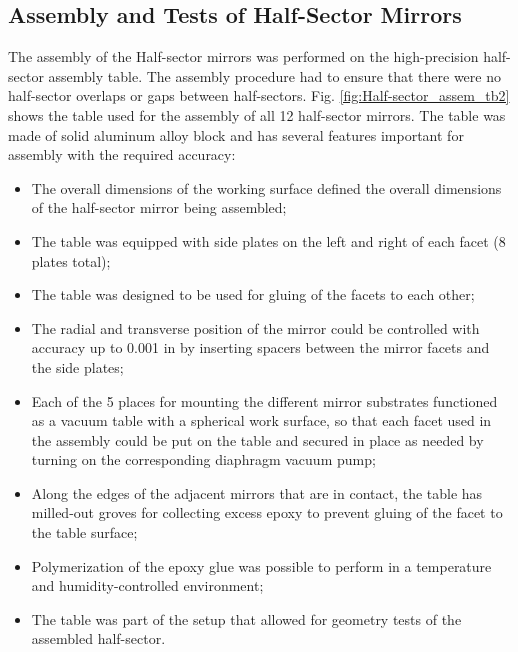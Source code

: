 \subsection{Assembly and Tests of Half-Sector Mirrors}
The assembly of the Half-sector mirrors was performed on the high-precision half-sector assembly table. The assembly procedure had to ensure that there were no half-sector overlaps or gaps between half-sectors. Fig. \ref{fig:Half-sector_assem_tb2} shows the table used for the assembly of all 12 half-sector mirrors. The table was made of solid aluminum alloy block and has several features important for assembly with the required accuracy:
\begin{itemize}
    \item The overall dimensions of the working surface defined the overall dimensions of the half-sector mirror being assembled;
    \item The table was equipped with side plates on the left and right of each facet (8 plates total);
    \item The table was designed to be used for gluing of the facets to each other;
    \item The radial and transverse position of the mirror could be controlled with accuracy up to 0.001 in by inserting spacers between the mirror facets and the side plates;
    \item Each of the 5 places for mounting the different mirror substrates functioned as a vacuum table with a spherical work surface, so that each  facet used in the assembly could  be put on the table and secured in place as needed by turning on the corresponding  diaphragm vacuum pump;
    \item Along the edges of the adjacent mirrors that are in contact, the table has milled-out groves for collecting excess epoxy to prevent gluing of the facet to the table surface;
    \item Polymerization of the epoxy glue was possible to perform in a temperature and humidity-controlled environment;
    \item The table was part of the setup that allowed for geometry tests of the assembled half-sector.
\end{itemize}

